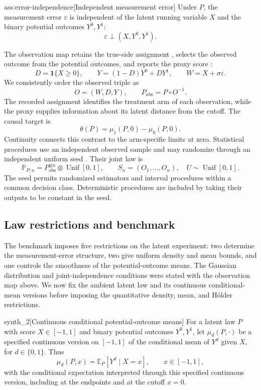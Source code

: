 \begin{assumptionv}{ass:error-independence}[Independent measurement error]
Under \(P\), the measurement error \(\varepsilon\) is independent of the latent running variable \(X\) and the binary potential outcomes \(Y^0,Y^1\):
\[
\varepsilon\perp(X,Y^0,Y^1).
\]
\end{assumptionv}

The observation map retains the true-side assignment , selects the observed outcome  from the potential outcomes, and reports the proxy score :
\[
D=\mathbf1\{X\ge0\},\qquad
Y=(1-D)Y^0+DY^1,\qquad
W=X+\sigma\varepsilon.
\]
We consistently order the observed triple as
\[
O=(W,D,Y),\qquad
P_{\mathrm{obs}}=P\circ O^{-1}.
\]
The recorded assignment identifies the treatment arm of each observation, while the proxy supplies information about its latent distance from the cutoff. The causal target  is
\[
\theta(P)=\mu_1(P,0)-\mu_0(P,0).
\]
Continuity connects this contrast to the arm-specific limits at zero. Statistical procedures use an independent observed sample  and may randomize through an independent uniform seed . Their joint law is
\[
\mathbb P_{P,n}=P_{\mathrm{obs}}^{\otimes n}\otimes\operatorname{Unif}[0,1],
\qquad
S_n=(O_1,\ldots,O_n),\quad U\sim\operatorname{Unif}[0,1].
\]
The seed permits randomized estimators and interval procedures within a common decision class. Deterministic procedures are included by taking their outputs to be constant in the seed.

\subsection{Law restrictions and benchmark}

The benchmark imposes five restrictions on the latent experiment: two determine the measurement-error structure, two give uniform density and mean bounds, and one controls the smoothness of the potential-outcome means. The Gaussian distribution and joint-independence conditions were stated with the observation map above. We now fix the ambient latent law and its continuous conditional-mean versions before imposing the quantitative density, mean, and Hölder restrictions.

\begin{definitionv}{synth_2}[Continuous conditional potential-outcome means]
For a latent law \(P\) with score \(X\in[-1,1]\) and binary potential outcomes \(Y^0,Y^1\), let \(\mu_d(P,\cdot)\) be a specified continuous version on \([-1,1]\) of the conditional mean of \(Y^d\) given \(X\), for \(d\in\{0,1\}\). Thus
\[
\mu_d(P,x)=\mathbb E_P[Y^d\mid X=x],
\qquad x\in[-1,1],
\]
with the conditional expectation interpreted through this specified continuous version, including at the endpoints and at the cutoff \(x=0\).
\end{definitionv}

